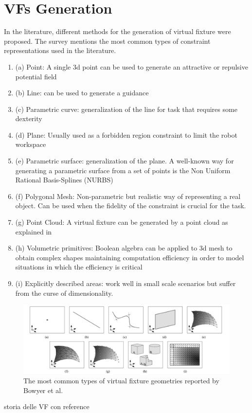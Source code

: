 \section{VFs Generation}
In the literature, different methods for the generation of virtual fixture were proposed. The survey \cite{bowyer_active_2014} mentions the most common types of constraint representations used in the literature.
\begin{enumerate}
    \item (a) Point: A single 3d point can be used to generate an attractive or repulsive potential field
    \item (b) Line: can be used to generate a guidance
    \item (c) Parametric curve: generalization of the line for task that requires some dexterity
    \item (d) Plane: Usually used as a forbidden region constraint to limit the robot workspace
    \item (e) Parametric surface: generalization of the plane. A well-known way for generating a parametric surface from a set of points is the Non Uniform Rational Basis-Splines (NURBS)
    \item (f) Polygonal Mesh: Non-parametric but realistic way of representing a real object. Can be used when the fidelity of the constraint is crucial for the task.
    \item (g) Point Cloud: A virtual fixture can be generated by a point cloud as explained in \cite{ryden_forbidden-region_2012} 
    \item (h) Volumetric primitives: Boolean algebra can be applied to 3d mesh to obtain complex shapes maintaining computation efficiency in order to model situations in which the efficiency is critical
    \item (i) Explicitly described areas: work well in small scale scenarios but suffer from the curse of dimensionality.
\end{enumerate}
\begin{figure}[H]
    \centering   \includegraphics[width=0.7\linewidth]{images/virtual_fixtures/vf_geoms.png}
    \caption{The most common types of virtual fixture geometries reported by Bowyer et al.}
    \label{fig:virtual_fixture:vf_geoms}
\end{figure}
\TODO storia delle VF con reference
\cite{selvaggio_passive_2018}
\cite{soldati_proposal_2020}